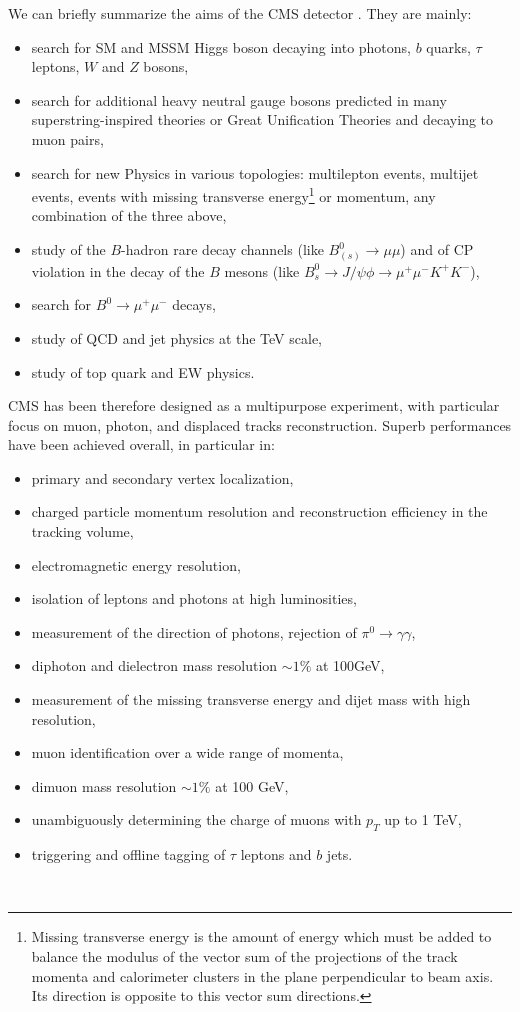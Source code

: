 We can briefly summarize the aims of the CMS detector \cite{CMS1}. They are mainly:
\begin{itemize}
\item search for SM and MSSM Higgs boson decaying into photons, $b$ quarks, $\tau$
leptons, $W$ and $Z$ bosons,
\item search for additional heavy neutral gauge bosons predicted in many superstring-inspired 
theories or Great Unification Theories and decaying to muon pairs,
\item search for new Physics in various topologies: multilepton events, multijet
events, events with missing transverse energy\footnote{Missing transverse energy \met is the amount of energy which must be added to balance the modulus of the vector sum of the projections of the track momenta and calorimeter clusters in the plane perpendicular to beam axis. Its direction is opposite to this vector sum directions.} or momentum, any combination 
of the three above,
\item study of the $B$-hadron rare decay channels (like $B^0_{(s)}\to\mu\mu$) and of CP violation in the decay of the $B$ mesons (like $B^0_s\to J/\psi\phi\to\mu^+\mu^-K^+K^-$),
\item search for $B^0\to\mu^+\mu^-$ decays,
\item study of QCD and jet physics at the TeV scale,
\item study of top quark and EW physics.
\end{itemize}
CMS has been therefore designed as a multipurpose experiment, with particular 
focus on muon, photon, and displaced tracks
reconstruction. Superb performances have been achieved overall, in particular in:
\begin{itemize}
\item primary and secondary vertex localization,
\item charged particle momentum resolution and reconstruction efficiency in the
tracking volume,
\item electromagnetic energy resolution,
\item isolation of leptons and photons at high luminosities,
\item measurement of the direction of photons, rejection of $\pi^0\to\gamma\gamma$,
\item diphoton and dielectron mass resolution $\sim1\%$ at 100GeV,
\item measurement of the missing transverse energy \met and dijet mass with high
resolution,
\item muon identification over a wide range of momenta,
\item dimuon mass resolution $\sim1\%$ at 100 GeV,
\item unambiguously determining the charge of muons with $p_T$ up to 1 TeV,
\item triggering and offline tagging of $\tau$ leptons and $b$ jets.
\end{itemize}
\mbox{}\\

